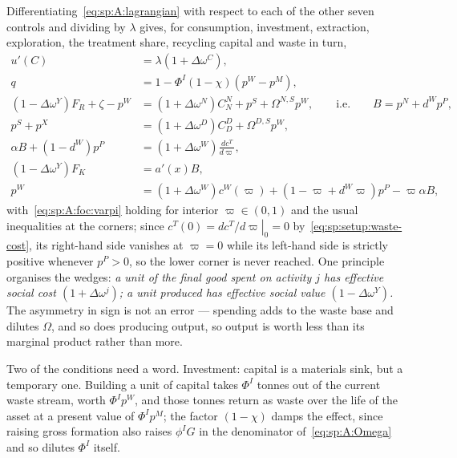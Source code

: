 Differentiating~\eqref{eq:sp:A:lagrangian} with respect to each
of the other seven controls and dividing by $\lambda$ gives, for consumption, investment, extraction,
exploration, the treatment share, recycling capital and waste in turn,
\begin{align}
u'\!\left(C\right) &= \lambda\left(1+\Delta\omega^C\right),
\label{eq:sp:A:foc:C}
\\[0.15em]
q &= 1-\Phi^I\left(1-\chi\right)\left(p^W-p^M\right),
\label{eq:sp:A:foc:I}
\\[0.15em]
\left(1-\Delta\omega^Y\right)F_R+\zeta-p^W
&= \left(1+\Delta\omega^N\right)C^N_N+p^S+\Omega^{N,S}p^W,
\qquad\text{i.e.}\qquad
B = p^N+d^Wp^P,
\label{eq:sp:A:foc:N}
\\[0.15em]
p^S+p^X &= \left(1+\Delta\omega^D\right)C^D_D+\Omega^{D,S}p^W,
\label{eq:sp:A:foc:D}
\\[0.15em]
\alpha B+\left(1-d^W\right)p^P &= \left(1+\Delta\omega^W\right)\frac{dc^T}{d\varpi},
\label{eq:sp:A:foc:varpi}
\\[0.15em]
\left(1-\Delta\omega^Y\right)F_K &= a'\!\left(x\right)B,
\label{eq:sp:A:foc:KR}
\\[0.15em]
p^W &= \left(1+\Delta\omega^W\right)c^W\!\left(\varpi\right)
+\left(1-\varpi+d^W\varpi\right)p^P-\varpi\alpha B,
\label{eq:sp:A:foc:W}
\end{align}
with~\eqref{eq:sp:A:foc:varpi} holding for interior $\varpi\in\left(0,1\right)$ and the usual
inequalities at the corners; since $c^T(0)=\left.dc^T/d\varpi\right|_{0}=0$
by~\eqref{eq:sp:setup:waste-cost}, its right-hand side vanishes at $\varpi=0$ while its left-hand
side is strictly positive whenever $p^P>0$, so the lower corner is never reached. One principle
organises the wedges: \emph{a unit of the final good spent
on activity $j$ has effective social cost $\left(1+\Delta\omega^j\right)$; a unit produced has
effective social value $\left(1-\Delta\omega^Y\right)$.} The asymmetry in sign is not an error ---
spending adds to the waste base and dilutes $\Omega$, and so does producing output, so output is
worth less than its marginal product rather than more.

Two of the conditions need a word. Investment: capital is a materials sink, but a temporary one.
Building a unit of capital takes $\Phi^I$ tonnes out of the current waste stream, worth $\Phi^Ip^W$,
and those tonnes return as waste over the life of the asset at a present value of $\Phi^Ip^M$; the
factor $\left(1-\chi\right)$ damps the effect, since raising gross formation also raises $\phi^IG$ in
the denominator of~\eqref{eq:sp:A:Omega} and so dilutes $\Phi^I$ itself.

